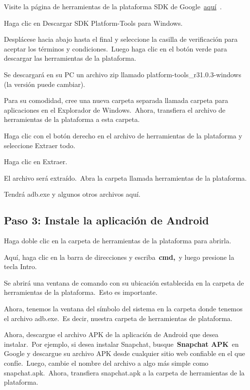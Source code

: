 \documentclass[
  letterpaper,
  DIV=11,
  numbers=noendperiod]{scrartcl}
\begin{document}
Visite la página de herramientas de la plataforma SDK de
Google~\href{https://developer.android.com/studio/releases/platform-tools.html}{aquí}~.

Haga clic en Descargar SDK Platform-Tools para Windows.

Desplácese hacia abajo hasta el final y seleccione la casilla de
verificación para aceptar los términos y condiciones.~Luego haga clic en
el botón verde para descargar las herramientas de la plataforma.

Se descargará en su PC un archivo zip llamado
platform-tools\_r31.0.3-windows (la versión puede cambiar).

Para su comodidad, cree una nueva carpeta separada llamada carpeta para
aplicaciones en el Explorador de Windows.~Ahora, transfiera el archivo
de herramientas de la plataforma a esta carpeta.

Haga clic con el botón derecho en el archivo de herramientas de la
plataforma y seleccione Extraer todo.

Haga clic en Extraer.

El archivo será extraído.~Abra la carpeta llamada herramientas de la
plataforma.

Tendrá adb.exe y algunos otros archivos aquí.

\hypertarget{paso-3-instale-la-aplicaciuxf3n-de-android}{%
\subsection{Paso 3: Instale la aplicación de
Android}\label{paso-3-instale-la-aplicaciuxf3n-de-android}}

Haga doble clic en la carpeta de herramientas de la plataforma para
abrirla.

Aquí, haga clic en la barra de direcciones y escriba~\textbf{cmd,}~y
luego presione la tecla Intro.

Se abrirá una ventana de comando con su ubicación establecida en la
carpeta de herramientas de la plataforma.~Esto es importante.

Ahora, tenemos la ventana del símbolo del sistema en la carpeta donde
tenemos el archivo adb.exe.~Es decir, nuestra carpeta de herramientas de
plataforma.

Ahora, descargue el archivo APK de la aplicación de Android que desea
instalar.~Por ejemplo, si desea instalar Snapchat,
busque~\textbf{Snapchat APK}~en Google y descargue su archivo APK desde
cualquier sitio web confiable en el que confíe.~Luego, cambie el nombre
del archivo a algo más simple como snapchat.apk.~Ahora, transfiera
snapchat.apk a la carpeta de herramientas de la plataforma.
\end{document}
